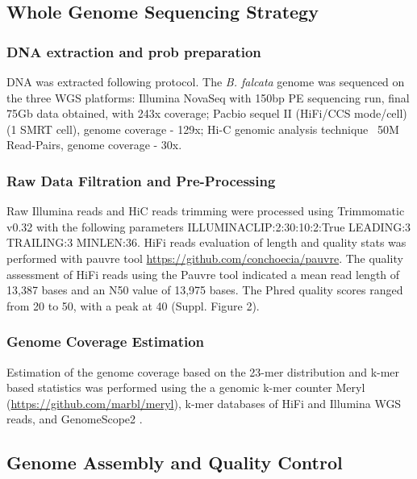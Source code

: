 \documentclass[9pt,twocolumn,twoside,lineno]{gsag3jnl}
\begin{document}
\subsection{Whole Genome Sequencing Strategy}

\subsubsection{DNA extraction and prob preparation}

DNA was extracted following \cite{huang2023} protocol. The \textit{B. falcata} genome was sequenced on the three WGS platforms: Illumina NovaSeq with 150bp PE sequencing run, final 75Gb data obtained, with 243x coverage; Pacbio sequel II (HiFi/CCS mode/cell) (1 SMRT cell), genome coverage - 129x; Hi-C genomic analysis technique ~50M Read-Pairs, genome coverage - 30x.

\subsubsection{Raw Data Filtration and Pre-Processing}
Raw Illumina reads and HiC reads trimming were processed using Trimmomatic v0.32 \citep{bolger2014} with the following parameters ILLUMINACLIP:2:30:10:2:True LEADING:3 TRAILING:3 MINLEN:36. HiFi reads evaluation of length and quality stats was performed with pauvre tool \url{https://github.com/conchoecia/pauvre}.
The quality assessment of HiFi reads using the Pauvre tool indicated a mean read length of 13,387 bases and an N50 value of 13,975 bases. The Phred quality scores ranged from 20 to 50, with a peak at 40 (Suppl. Figure 2).



\subsubsection{Genome Coverage Estimation}
Estimation of the genome coverage based on the 23-mer distribution and k-mer based statistics was performed using the a genomic k-mer counter Meryl (\url{https://github.com/marbl/meryl}), k-mer databases of HiFi and Illumina WGS reads, and GenomeScope2 \cite{ranallo2020genomescope}.


\subsection{Genome Assembly and Quality Control}
\end{document}
